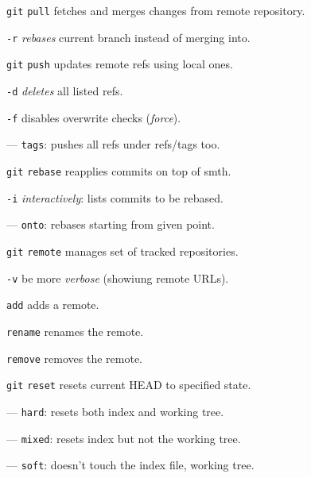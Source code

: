 \documentclass{reference_card}
\begin{document}
\begin{multicols*}{3}
\begin{compactenum}
\item [\texttt{git}] \texttt{pull} fetches and merges changes from remote repository.
\item [\texttt{-r}] \emph{rebases} current branch instead of merging into.
\end{compactenum}

\begin{compactenum}
\item [\texttt{git}] \texttt{push} updates remote refs using local ones.
\item [\texttt{-d}] \emph{deletes} all listed refs.
\item [\texttt{-f}] disables overwrite checks (\emph{force}).
\item [---] \texttt{tags}: pushes all refs under refs/tags too.
\end{compactenum}

\begin{compactenum}
\item [\texttt{git}] \texttt{rebase} reapplies commits on top of smth.
\item [\texttt{-i}] \emph{interactively}: lists commits to be rebased.
\item [---] \texttt{onto}: rebases starting from given point.
\end{compactenum}

\begin{compactenum}
\item [\texttt{git}] \texttt{remote} manages set of tracked repositories.
\item [\texttt{-v}] be more \emph{verbose} (showiung remote URLs).
\item [\scriptsize \texttt{add}] adds a remote.
\item [\scriptsize \texttt{rename}] renames the remote.
\item [\scriptsize \texttt{remove}] removes the remote.
\end{compactenum}

\begin{compactenum}
\item [\texttt{git}] \texttt{reset} resets current HEAD to specified state.
\item [---] \texttt{hard}: resets both index and working tree.
\item [---] \texttt{mixed}: resets index but not the working tree.
\item [---] \texttt{soft}: doesn't touch the index file, working tree.
\end{compactenum}


\end{multicols*}
\end{document}
